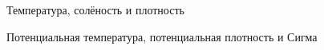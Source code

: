 \begin{chapter}{Температура, солёность и плотность}
\begin{section}{Потенциальная температура, потенциальная плотность и Сигма}
%
%


\end{section}
\end{chapter}
